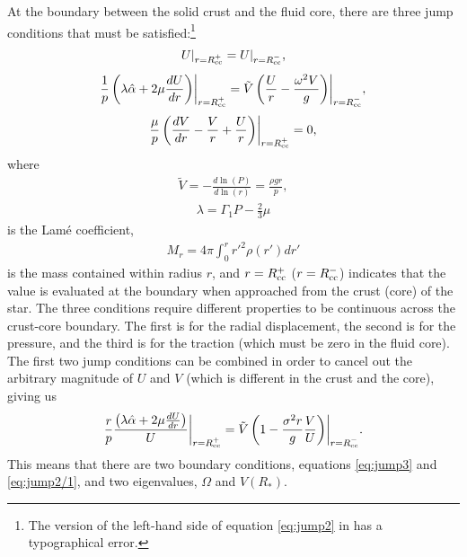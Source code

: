\documentclass[fleqn,usenatbib]{mnras}
\begin{document}

At the boundary between the solid crust and the fluid core, there are three jump conditions that must be satisfied:\footnote{The version of the left-hand side of equation \ref{eq:jump2} in \citet{mcdermott1988nonradial} has a typographical error.}
\begin{align}
U\rvert_{r=R_{\rm cc}^{+}}=U\rvert_{r=R_{\rm cc}^{-}},
\label{eq:jump1}
\end{align}
\begin{align}
\frac{1}{p}\left(\lambda\hat{\alpha}+2\mu\frac{dU}{dr}\right)\biggr\rvert_{r=R_{\rm cc}^{+}}=\tilde{V}\left(\frac{U}{r}-\frac{\omega^2V}{g}\right)\biggr\rvert_{r=R_{\rm cc}^{-}},
\label{eq:jump2}
\end{align}
\begin{align}
\frac{\mu}{p}\left(\frac{dV}{dr}-\frac{V}{r}+\frac{U}{r}\right)\biggr\rvert_{r=R_{\rm cc}^{+}}=0,
\label{eq:jump3}
\end{align}
\noindent where 
\begin{align}
\tilde{V}=-\frac{d\ln\left(P\right)}{d\ln\left(r\right)}=\frac{\rho g r}{p},
\end{align}
\begin{align}
\lambda=\Gamma_1P-\frac{2}{3}\mu
\end{align}
\noindent is the Lam\'e coefficient, 
\begin{align}
M_r=4\pi\int^r_0 r'^2\rho(r')dr'
\label{eq:mass_r}
\end{align}
\noindent is the mass contained within radius $r$, and $r=R_{\rm cc}^{+}$ ($r=R_{\rm cc}^{-}$) indicates that the value is evaluated at the boundary when approached from the crust (core) of the star. The three conditions require different properties to be continuous across the crust-core boundary. The first is for the radial displacement, the second is for the pressure, and the third is for the traction (which must be zero in the fluid core). The first two jump conditions can be combined in order to cancel out the arbitrary magnitude of $U$ and $V$ (which is different in the crust and the core), giving us
\begin{align}
\frac{r}{p}\frac{\left(\lambda\hat{\alpha}+2\mu\frac{dU}{dr}\right)}{U}\biggr\rvert_{r=R_{\rm cc}^{+}}=\tilde{V}\left(1-\frac{\sigma^2r}{g}\frac{V}{U}\right)\biggr\rvert_{r=R_{\rm cc}^{-}}.
\label{eq:jump2/1}
\end{align}
\noindent This means that there are two boundary conditions, equations \ref{eq:jump3} and \ref{eq:jump2/1}, and two eigenvalues, $\Omega$ and $V(R_*)$.
\end{document}
